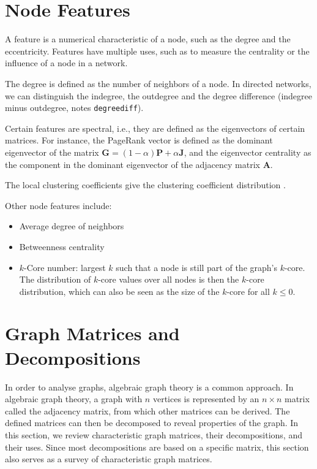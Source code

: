 \documentclass{article}
\begin{document}
\section{Node Features}
\label{sec:features}
A feature is a numerical characteristic of a node, such as the degree
and the eccentricity.  Features have multiple uses, such as to measure
the centrality or the influence of a node in a network. 

The degree is defined as the number 
of neighbors of a node.  In directed networks, we can distinguish the
indegree, the outdegree and the degree difference (indegree minus
outdegree, notes \texttt{degreediff}). 

Certain features are spectral, i.e., they are defined as the
eigenvectors of certain matrices.  For instance, the PageRank vector
 is defined as the dominant eigenvector of
the matrix $\mathbf G = (1-\alpha) \mathbf P + \alpha\mathbf J$, and the
eigenvector centrality as the component in the dominant eigenvector of
the adjacency matrix $\mathbf A$. 

The local clustering coefficients give the clustering coefficient
distribution  \citep{b865}. 

Other node features include:
\begin{itemize}
\item Average degree of neighbors
\item Betweenness centrality
\item $k$-Core number:  largest $k$ such that a node is still part of
  the graph's $k$-core.  The distribution of $k$-core values over all
  nodes is then the $k$-core distribution, which can also be seen as the
  size of the $k$-core for all $k \leq 0$. 
\end{itemize}

\section{Graph Matrices and Decompositions}
\label{sec:matrix}
In order to analyse graphs, algebraic graph theory is a common
approach.  In algebraic graph theory, a graph with $n$ vertices is
represented by an $n\times n$ matrix called the adjacency matrix, from
which other matrices can be derived.  The defined matrices can then be
decomposed to reveal properties of the graph. 
In this section, we review characteristic graph matrices, their
decompositions, and their uses.  Since most decompositions are based on
a specific matrix, this section also serves as a survey of
characteristic graph matrices.  
\end{document}
